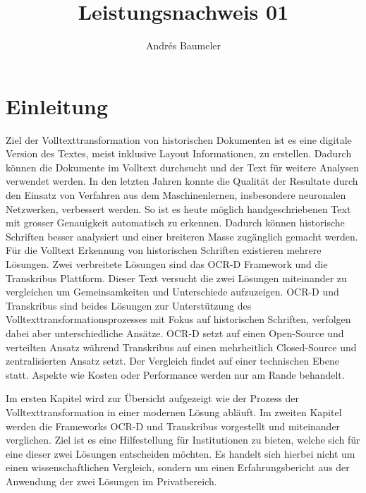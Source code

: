 \documentclass[a4paper,oneside, 12pt]{report}
\title{Leistungsnachweis 01}
\author{Andrés Baumeler}
\begin{document}

\pagestyle{empty} %





\cleardoublepage
\tableofcontents %
\cleardoublepage %

\pagestyle{plain} %



\chapter{Einleitung}\label{sec:motivation}
Ziel der Volltexttransformation von historischen Dokumenten ist es eine digitale Version des Textes, meist inklusive Layout Informationen, zu erstellen. Dadurch können die Dokumente im Volltext durchsucht und der Text für weitere Analysen verwendet werden. In den letzten Jahren konnte die Qualität der Resultate durch den Einsatz von Verfahren aus dem Maschinenlernen, insbesondere neuronalen Netzwerken, verbessert werden. So ist es heute möglich handgeschriebenen Text mit grosser Genauigkeit automatisch zu erkennen. Dadurch können historische Schriften besser analysiert und einer breiteren Masse zugänglich gemacht werden.
Für die Volltext Erkennung von historischen Schriften existieren mehrere Lösungen. Zwei verbreitete Lösungen sind das OCR-D Framework und die Transkribus Plattform. Dieser Text versucht die zwei Lösungen miteinander zu vergleichen um Gemeinsamkeiten und Unterschiede aufzuzeigen. OCR-D und Transkribus sind beides Lösungen zur Unterstützung des Volltexttransformationsprozesses mit Fokus auf historischen Schriften, verfolgen dabei aber unterschiedliche Ansätze. OCR-D setzt auf einen Open-Source und verteilten Ansatz während Transkribus auf einen mehrheitlich Closed-Source und zentralisierten Ansatz setzt. Der Vergleich findet auf einer technischen Ebene statt. Aspekte wie Kosten oder Performance werden nur am Rande behandelt.

Im ersten Kapitel wird zur Übersicht aufgezeigt wie der Prozess der Volltexttransformation in einer modernen Lösung abläuft. Im zweiten Kapitel werden die Frameworks OCR-D und Transkribus vorgestellt und miteinander verglichen. Ziel ist es eine Hilfestellung für Institutionen zu bieten, welche sich für eine dieser zwei Lösungen entscheiden möchten. Es handelt sich hierbei nicht um einen wissenschaftlichen Vergleich, sondern um einen Erfahrungsbericht aus der Anwendung der zwei Lösungen im Privatbereich. 
\end{document}
